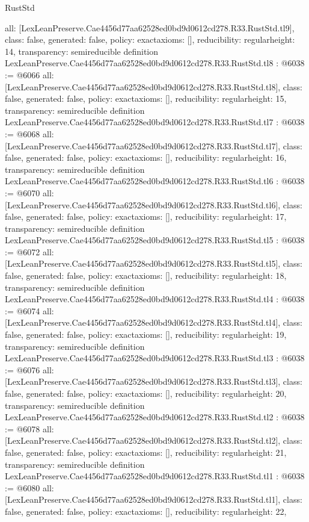 \begin{lexlean}{RustStd}
\begin{coremodule}
{  all: [LexLeanPreserve.Cae4456d77aa62528ed0bd9d0612cd278.R33.RustStd.tl9],
  class: false,
  generated: false,
  policy: exact{axioms: []},
  reducibility: regular{height: 14},
  transparency: semireducible
}
definition LexLeanPreserve.Cae4456d77aa62528ed0bd9d0612cd278.R33.RustStd.tl8 : @6038 := @6066 {
  all: [LexLeanPreserve.Cae4456d77aa62528ed0bd9d0612cd278.R33.RustStd.tl8],
  class: false,
  generated: false,
  policy: exact{axioms: []},
  reducibility: regular{height: 15},
  transparency: semireducible
}
definition LexLeanPreserve.Cae4456d77aa62528ed0bd9d0612cd278.R33.RustStd.tl7 : @6038 := @6068 {
  all: [LexLeanPreserve.Cae4456d77aa62528ed0bd9d0612cd278.R33.RustStd.tl7],
  class: false,
  generated: false,
  policy: exact{axioms: []},
  reducibility: regular{height: 16},
  transparency: semireducible
}
definition LexLeanPreserve.Cae4456d77aa62528ed0bd9d0612cd278.R33.RustStd.tl6 : @6038 := @6070 {
  all: [LexLeanPreserve.Cae4456d77aa62528ed0bd9d0612cd278.R33.RustStd.tl6],
  class: false,
  generated: false,
  policy: exact{axioms: []},
  reducibility: regular{height: 17},
  transparency: semireducible
}
definition LexLeanPreserve.Cae4456d77aa62528ed0bd9d0612cd278.R33.RustStd.tl5 : @6038 := @6072 {
  all: [LexLeanPreserve.Cae4456d77aa62528ed0bd9d0612cd278.R33.RustStd.tl5],
  class: false,
  generated: false,
  policy: exact{axioms: []},
  reducibility: regular{height: 18},
  transparency: semireducible
}
definition LexLeanPreserve.Cae4456d77aa62528ed0bd9d0612cd278.R33.RustStd.tl4 : @6038 := @6074 {
  all: [LexLeanPreserve.Cae4456d77aa62528ed0bd9d0612cd278.R33.RustStd.tl4],
  class: false,
  generated: false,
  policy: exact{axioms: []},
  reducibility: regular{height: 19},
  transparency: semireducible
}
definition LexLeanPreserve.Cae4456d77aa62528ed0bd9d0612cd278.R33.RustStd.tl3 : @6038 := @6076 {
  all: [LexLeanPreserve.Cae4456d77aa62528ed0bd9d0612cd278.R33.RustStd.tl3],
  class: false,
  generated: false,
  policy: exact{axioms: []},
  reducibility: regular{height: 20},
  transparency: semireducible
}
definition LexLeanPreserve.Cae4456d77aa62528ed0bd9d0612cd278.R33.RustStd.tl2 : @6038 := @6078 {
  all: [LexLeanPreserve.Cae4456d77aa62528ed0bd9d0612cd278.R33.RustStd.tl2],
  class: false,
  generated: false,
  policy: exact{axioms: []},
  reducibility: regular{height: 21},
  transparency: semireducible
}
definition LexLeanPreserve.Cae4456d77aa62528ed0bd9d0612cd278.R33.RustStd.tl1 : @6038 := @6080 {
  all: [LexLeanPreserve.Cae4456d77aa62528ed0bd9d0612cd278.R33.RustStd.tl1],
  class: false,
  generated: false,
  policy: exact{axioms: []},
  reducibility: regular{height: 22},
}
\end{coremodule}
\end{lexlean}
